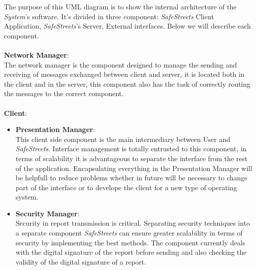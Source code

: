 \documentclass{article}
\begin{document}
The purpose of this UML diagram is to show the internal architecture of the \textit{System}'s software. It's divided in 
three component: \textit{SafeStreets} Client Application, \textit{SafeStreets}'s Server, External interfaces.
Below we will describe each component.
\\
\\
\textbf{Network Manager}: \\
The network manager is the component designed to manage the sending and receiving of 
messages exchanged between client and server, it is located both in the client and in the 
server, this component also has the task of correctly routing the messages to the correct 
component.
\\
\\
\textbf{Client}:

\begin{itemize}

\item \textbf{Presentation Manager}:\\
This client side component is the main intermediary between User and \textit{SafeStreets}. 
Interface management is totally entrusted to this component, in terms of scalability it 
is advantageous to separate the interface from the rest of the application. Encapsulating 
everything in the Presentation Manager will be helpfull to reduce problems whether in future 
will be necessary to change part of the interface or to develope the client for a new type of 
operating system.

\item \textbf{Security Manager}:\\
Security in report transmission is critical. Separating security techniques into a 
separate component \textit{SafeStreets} can ensure greater scalability in terms of security 
by implementing the best methods. The component currently deals with the digital signature 
of the report before sending and also checking the validity of the digital signature of a 
report.


\end{itemize}
\end{document}
